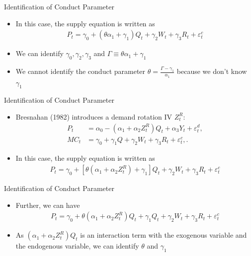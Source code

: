 \documentclass[aspectratio = 169]{beamer}
\theoremstyle{definition}
\begin{document}
\begin{frame}{Identification of Conduct Parameter}
    \begin{itemize}
        \item In this case, the supply equation is written as
        \begin{align}
            P_t = \gamma_0 + (\theta\alpha_1 + \gamma_1) Q_t   + \gamma_2 W_{t} + \gamma_3 R_t + \varepsilon^{c}_{t}
        \end{align}
        \item We can identify $ \gamma_0, \gamma_2, \gamma_3$ and $\Gamma \equiv \theta\alpha_1 + \gamma_1$
        \item We cannot identify the conduct parameter $\theta = \frac{\Gamma - \gamma_1}{\alpha_1}$ because we don't know $\gamma_1$
    \end{itemize}
\end{frame}


\begin{frame}{Identification of Conduct Parameter}
    \begin{itemize}
        \item Bresnahan (1982) introduces a demand rotation IV $Z_t^R$:
        \begin{align}
            P_t &= \alpha_0 - (\alpha_1 + \alpha_2Z^{R}_{t})Q_t + \alpha_3 Y_t + \varepsilon^{d}_{t},\\
            MC_t &= \gamma_0  + \gamma_1 Q + \gamma_2 W_{t} + \gamma_3 R_t + \varepsilon^{c}_{t},.
        \end{align}
        \item In this case, the supply equation is written as
        \begin{align}
            P_t = \gamma_0 + [\theta(\alpha_1 + \alpha_2Z^{R}_{t})+ \gamma_1] Q_t   + \gamma_2 W_{t} + \gamma_3 R_t + \varepsilon^{c}_{t}
        \end{align}
    \end{itemize}
\end{frame}


\begin{frame}{Identification of Conduct Parameter}
    \begin{itemize}
        \item Further, we can have
        \begin{align}
            P_t = \gamma_0 + \theta(\alpha_1 +\alpha_2Z^{R}_{t})Q_t + \gamma_1 Q_t   + \gamma_2 W_{t} + \gamma_3 R_t + \varepsilon^{c}_{t}
        \end{align}
        \item As $(\alpha_1 +\alpha_2Z^{R}_{t})Q_t$ is an interaction term with the exogenous variable and the endogenous variable, we can identify $\theta$ and $\gamma_1$
    \end{itemize}
\end{frame}
\end{document}
